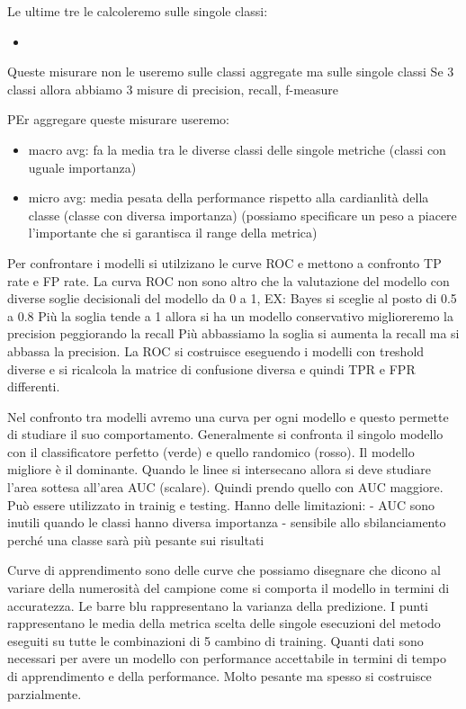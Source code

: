 Le ultime tre le calcoleremo sulle singole classi:
\begin{itemize}
    \item 
\end{itemize}


Queste misurare non le useremo sulle classi aggregate ma sulle singole classi
Se 3 classi allora abbiamo 3 misure di precision, recall, f-measure


PEr aggregare queste misurare useremo:
\begin{itemize}
    \item macro avg: fa la media tra le diverse classi delle singole metriche 
    (classi con uguale importanza)
    \item micro avg: media pesata della performance rispetto alla cardianlità 
    della classe (classe con diversa importanza) (possiamo specificare un peso 
    a piacere l'importante che si garantisca il range della metrica)
\end{itemize}


Per confrontare i modelli si utilzizano le curve ROC e mettono a confronto TP rate
e FP rate. La curva ROC non sono altro che la valutazione del modello con diverse
soglie decisionali del modello da 0 a 1, EX: Bayes si sceglie al posto di 0.5 a 0.8 
Più la soglia tende a 1 allora si ha un modello conservativo miglioreremo la precision
peggiorando la recall
Più abbassiamo la soglia si aumenta la recall ma si abbassa la precision.
La ROC si costruisce eseguendo i modelli con treshold diverse e si ricalcola la 
matrice di confusione diversa e quindi TPR e FPR differenti.

Nel confronto tra modelli avremo una curva per ogni modello e questo permette di 
studiare il suo comportamento. Generalmente si confronta il singolo modello con il
classificatore perfetto (verde) e quello randomico (rosso). Il modello migliore è
il dominante. Quando le linee si intersecano allora si deve studiare l'area sottesa 
all'area AUC (scalare). Quindi prendo quello con AUC maggiore. Può essere utilizzato 
in trainig e testing.
Hanno delle limitazioni:
- AUC sono inutili quando le classi hanno diversa importanza 
- sensibile allo sbilanciamento perché una classe sarà più pesante sui risultati


Curve di apprendimento sono delle curve che possiamo disegnare che dicono al variare
della numerosità del campione come si comporta il modello in termini di accuratezza.
Le barre blu rappresentano la varianza della predizione. I punti rappresentano
le media della metrica scelta delle singole esecuzioni del metodo eseguiti su tutte le combinazioni
di 5 cambino di training. 
Quanti dati sono necessari per avere un modello con performance accettabile in termini
di tempo di apprendimento e della performance. Molto pesante ma spesso si costruisce 
parzialmente.

